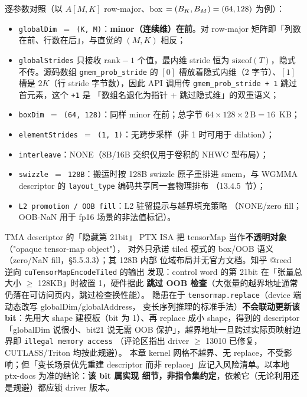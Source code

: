逐参数对照（以 $A[M, K]$ row-major、box $= (B\sb{K}, B\sb{M}) = (64, 128)$ 为例）：
\begin{itemize}
  \item \texttt{globalDim $=$ (K, M)}：\textbf{minor（连续维）在前}。对 row-major
        矩阵即「列数在前、行数在后」，与直觉的 $(M, K)$ 相反；
  \item \texttt{global\allowbreak{}Strides} 只接收 $\mathrm{rank} - 1$ 个值，最内维 stride 恒为
        $\mathrm{sizeof}(T)$，隐式不传。源码数组 \texttt{gmem\_\allowbreak{}prob\_\allowbreak{}stride} 的
        $[0]$ 槽放着隐式内维（2 字节）、$[1]$ 槽是 $2K$（行 stride 字节数），因此 API
        调用传 \texttt{gmem\_\allowbreak{}prob\_\allowbreak{}stride + 1} 跳过首元素，这个 \texttt{+1} 是
        「数组名退化为指针 + 跳过隐式维」的双重语义；
  \item \texttt{boxDim $=$ (64, 128)}：同样 minor 在前；总字节
        $64 \times 128 \times 2\,\mathrm{B} = 16$~KB；
  \item \texttt{element\allowbreak{}Strides $=\allowbreak{}$ \allowbreak{}(1,\allowbreak{} 1)}：无跨步采样（非 1 时可用于 dilation）；
  \item \texttt{interleave}：NONE（8B/16B 交织仅用于卷积的 NHWC 型布局）；
  \item \texttt{swizzle $=$ 128B}：搬运时按 128B swizzle 原子重排进 smem，与
        WGMMA descriptor 的 \texttt{layout\_type} 编码共享同一套物理排布
        （13.4.5~节）；
  \item \texttt{L2 promotion / OOB fill}：L2 驻留提示与越界填充策略
        （NONE/zero fill；OOB-NaN 用于 fp16 场景的非法值标记）。
\end{itemize}

\begin{kaogu}[F2·社区考据]{TMA descriptor 的「隐藏第 21bit」}
  PTX ISA 把 tensorMap 当作\textbf{不透明对象}（"opaque tensor-map object"），
  对外只承诺 tiled 模式的 box/OOB 语义（zero/NaN fill，§5.5.3.3）；其 128B 内部
  位域布局并无官方文档。知乎 @reed 逆向 \texttt{cu\allowbreak{}Tensor\allowbreak{}Map\allowbreak{}Encode\allowbreak{}Tiled} 的输出
  发现：control word 的第 21bit 在「张量总大小 $\ge$ 128KB」时被置 1，硬件据此
  \textbf{跳过 OOB 检查}（大张量的越界地址通常仍落在可访问页内，跳过检查换性能）。
  隐患在于 \texttt{tensormap.\allowbreak{}replace}（device 端动态改写 globalDim/globalAddress，
  变长序列推理的标准手法）\textbf{不会联动更新该 bit}：先用大 shape 建模板（bit 为
  1）、再 replace 成小 shape，得到的 descriptor「globalDim 说很小、bit21 说无需 OOB
  保护」，越界地址一旦跨过实际页映射边界即 \texttt{illegal memory access}
  （评论区指出 driver $\ge$ 13010 已修复，CUTLASS/Triton 均按此规避）。
  本章 kernel 网格不越界、无 replace，不受影响；但「变长场景优先重建 descriptor
  而非 replace」应记入风险清单。以本地 ptx-docs 为准的结论：\textbf{该 bit 属实现
  细节，非指令集约定}，依赖它（无论利用还是规避）都应锁 driver 版本。
\end{kaogu}

